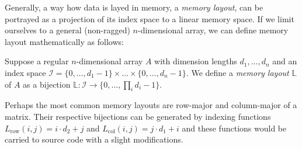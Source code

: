 


Generally, a way how data is layed in memory, a \emph{memory layout}, can be portrayed as a projection of its index space to a linear memory space. If we limit ourselves to a general (non-ragged) $n$-dimensional array, we can define memory layout mathematically as follows:

\begin{defn}
  Suppose a regular $n$-dimensional array $A$ with dimension lengths $d_1, \dots, d_n$ and an index space $\mathcal{I} = \{0,\dots,d_1 - 1\}\times \dots \times \{0,\dots,d_n - 1\}$. We define a \emph{memory layout} $\mathbb{L}$ of $A$ as a bijection $\mathbb{L}: \mathcal{I} \to \{0,\dots, \prod_{i}d_i - 1\}$. 
\end{defn}

Perhaps the most common memory layouts are row-major and column-major of a matrix. Their respective bijections can be generated by indexing functions $L_{\text{row}}(i,j) = i \cdot d_2 + j$ and $L_{\text{col}}(i,j) = j \cdot d_1 + i$ and these functions would be carried to source code with a slight modifications. 


